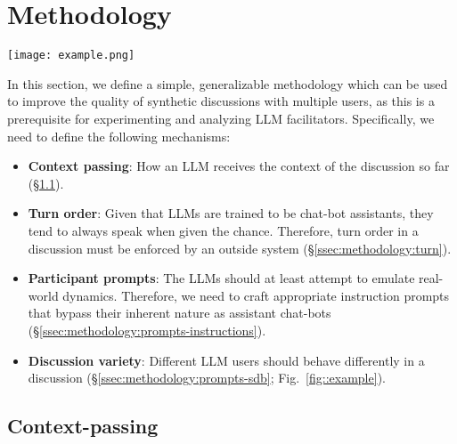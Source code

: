 %

\section{Methodology}
\label{sec:methodology}

\begin{figure*}[t]
	\centering
	\texttt{[image: example.png]}
	\caption{Excerpt from a synthetic discussion. The LLM participants use their sociodemographic prompts to insert personal stories and justify their perspectives in the discussion. They are also able to learn and retain information about other agents through conversation (a behavior also observed in \citet{park2023game}). User \texttt{CynicalInvestor88} is also a part of the discussion; not a hallucination. Comments clipped due to length.}
	\label{fig::example}
\end{figure*}

In this section, we define a simple, generalizable methodology which can be used to improve the quality of synthetic discussions with multiple users, as this is a prerequisite for experimenting and analyzing LLM facilitators. Specifically, we need to define the following mechanisms:

\begin{itemize}[nosep, noitemsep]
	\item \textbf{Context passing}: How an LLM receives the context of the discussion so far (\S\ref{ssec:methodology:context}).  
	
	\item \textbf{Turn order}: Given that LLMs are trained to be chat-bot assistants, they tend to always speak when given the chance. Therefore, turn order in a discussion must be enforced by an outside system (\S\ref{ssec:methodology:turn}).
	
	\item \textbf{Participant prompts}: The LLMs should at least attempt to emulate real-world dynamics. Therefore, we need to craft appropriate instruction prompts that bypass their inherent nature as assistant chat-bots (\S\ref{ssec:methodology:prompts-instructions}).
	
	\item \textbf{Discussion variety}: Different LLM users should behave differently in a discussion (\S\ref{ssec:methodology:prompts-sdb}; Fig.~\ref{fig::example}).
\end{itemize}

\subsection{Context-passing}
\label{ssec:methodology:context}

